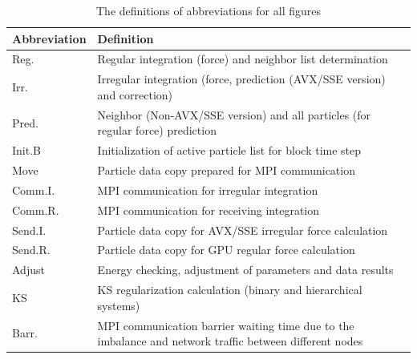 \documentclass[usenatbib,aas_macros]{mn2e}
\begin{document}
\begin{table}
  \caption{The definitions of abbreviations for all figures}%
  \begin{tabular}{l|l}
    \hline
    Abbreviation & Definition \\\hline
    Reg. & Regular integration (force) and neighbor list determination \\
    Irr. & Irregular integration (force, prediction (AVX/SSE version) and correction)\\
    Pred. & Neighbor (Non-AVX/SSE version) and all particles (for regular force) prediction \\
    Init.B & Initialization of active particle list for block time step \\
    Move  & Particle data copy prepared for MPI communication \\
    Comm.I. & MPI communication for irregular integration \\
    Comm.R. & MPI communication for receiving integration \\
    Send.I. & Particle data copy for AVX/SSE irregular force calculation\\
    Send.R. & Particle data copy for GPU regular force calculation \\
    Adjust  & Energy checking, adjustment of parameters and data results \\
    KS      & KS regularization calculation (binary and hierarchical systems) \\
    Barr.   & MPI communication barrier waiting time due to the imbalance and network traffic between different nodes \\
    \hline
  \end{tabular}
  \label{tab:def}
\end{table}
\end{document}
